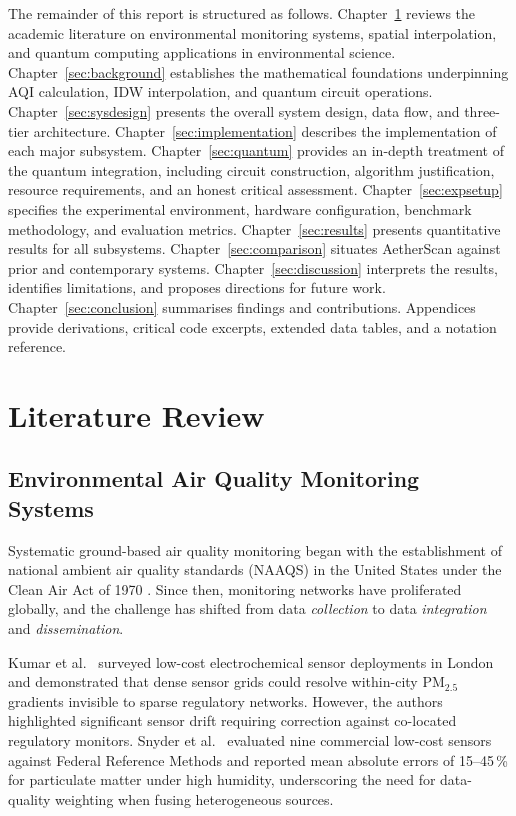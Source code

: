 \documentclass[12pt,a4paper]{article}
\begin{document}
The remainder of this report is structured as follows.
Chapter~\ref{sec:litreview} reviews the academic literature on environmental
monitoring systems, spatial interpolation, and quantum computing applications
in environmental science.
Chapter~\ref{sec:background} establishes the mathematical foundations
underpinning AQI calculation, IDW interpolation, and quantum circuit
operations.
Chapter~\ref{sec:sysdesign} presents the overall system design, data flow, and
three-tier architecture.
Chapter~\ref{sec:implementation} describes the implementation of each major
subsystem.
Chapter~\ref{sec:quantum} provides an in-depth treatment of the quantum
integration, including circuit construction, algorithm justification, resource
requirements, and an honest critical assessment.
Chapter~\ref{sec:expsetup} specifies the experimental environment, hardware
configuration, benchmark methodology, and evaluation metrics.
Chapter~\ref{sec:results} presents quantitative results for all subsystems.
Chapter~\ref{sec:comparison} situates AetherScan against prior and
contemporary systems.
Chapter~\ref{sec:discussion} interprets the results, identifies limitations,
and proposes directions for future work.
Chapter~\ref{sec:conclusion} summarises findings and contributions.
Appendices provide derivations, critical code excerpts, extended data tables,
and a notation reference.

\clearpage
\section{Literature Review}
\label{sec:litreview}

\subsection{Environmental Air Quality Monitoring Systems}
\label{sec:litreview:monitoring}

Systematic ground-based air quality monitoring began with the establishment of
national ambient air quality standards (NAAQS) in the United States under the
Clean Air Act of 1970 \cite{epa2012}. Since then, monitoring networks have
proliferated globally, and the challenge has shifted from data \emph{collection}
to data \emph{integration} and \emph{dissemination}.

Kumar et al.~\cite{kumar2015} surveyed low-cost electrochemical sensor
deployments in London and demonstrated that dense sensor grids could resolve
within-city $\text{PM}_{2.5}$ gradients invisible to sparse regulatory
networks. However, the authors highlighted significant sensor drift requiring
correction against co-located regulatory monitors. Snyder et al.~\cite{snyder2013}
evaluated nine commercial low-cost sensors against Federal Reference Methods and
reported mean absolute errors of 15--45\,\% for particulate matter under high
humidity, underscoring the need for data-quality weighting when fusing
heterogeneous sources.
\end{document}
